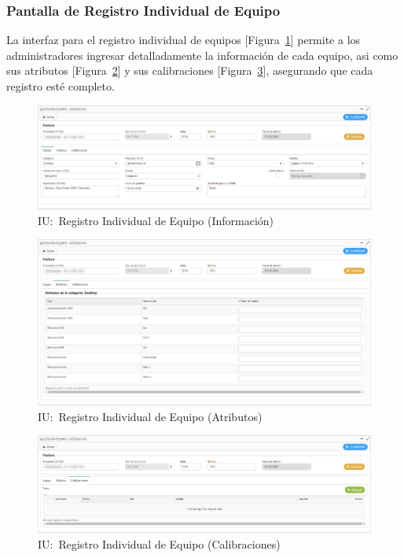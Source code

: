 \documentclass[stu, 12pt, letterpaper, donotrepeattitle, floatsintext, natbib]{apa7}
\begin{document}
\subsubsection{Pantalla de Registro Individual de Equipo}
La interfaz para el registro individual de equipos [Figura~\ref{datosEquipo}] permite a los administradores ingresar detalladamente la
información de cada equipo, asi como sus atributos [Figura~\ref{atributosEquipo}] y sus calibraciones [Figura~\ref{calibracionesEquipo}],
asegurando que cada registro esté completo.
\begin{figure}[H]
    \centering
    \caption{IU:~Registro Individual de Equipo (Información)}\label{datosEquipo}
    \includegraphics[width=16.5cm]{./images/datosEquipo.png}
\end{figure}
\begin{figure}[H]
    \centering
    \caption{IU:~Registro Individual de Equipo (Atributos)}\label{atributosEquipo}
    \includegraphics[width=16.5cm]{./images/equipoAtributos.png}
\end{figure}
\begin{figure}[H]
    \centering
    \caption{IU:~Registro Individual de Equipo (Calibraciones)}\label{calibracionesEquipo}
    \includegraphics[width=16.5cm]{./images/calibracionesEquipo.png}
\end{figure}
\end{document}

